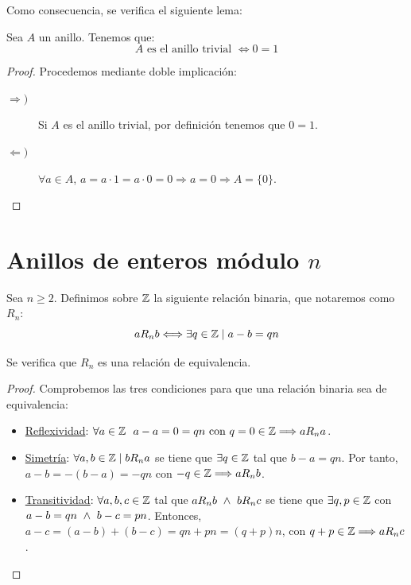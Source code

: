 Como consecuencia, se verifica el siguiente lema:
\begin{lema}
    Sea $A$ un anillo. Tenemos que:
    \begin{equation*}
        A \text{ es el anillo trivial } \Longleftrightarrow 0=1
    \end{equation*}
\end{lema}
\begin{proof}
    Procedemos mediante doble implicación:
    \begin{description}
        \item[$\Longrightarrow)$] Si $A$ es el anillo trivial, por definición tenemos que $0=1$.
        \item[$\Longleftarrow)$] $\forall a \in A$, $a = a\cdot 1 = a\cdot 0 = 0 \Longrightarrow a = 0 \Longrightarrow A = \{0\}$.
    \end{description}
\end{proof}

\section{Anillos de enteros módulo $n$}
\begin{definicion}
    Sea $n \geq 2$. Definimos sobre $\mathbb Z$ la siguiente relación binaria, que notaremos como $R_n$:
    \begin{equation*}
        aR_nb \Longleftrightarrow \exists q \in \mathbb Z \mid a-b = qn
    \end{equation*}
\end{definicion}

\begin{lema}
    Se verifica que $R_n$ es una relación de equivalencia.
\end{lema}
\begin{proof} Comprobemos las tres condiciones para que una relación binaria sea de equivalencia:
\begin{itemize}
    \item \underline{Reflexividad}: $\forall a \in \mathbb Z~~a-a = 0 = qn \mbox{ con } q = 0 \in \mathbb Z \Longrightarrow aR_na$.
    \item \underline{Simetría}: $\forall a,b \in \mathbb Z \mid bR_na$ se tiene que $\exists q \in \mathbb Z$ tal que $b-a = qn$. Por tanto, $a-b = -(b-a)=-qn$ con $-q \in \mathbb Z \Longrightarrow aR_nb$.
    \item \underline{Transitividad}: $\forall a,b,c \in \mathbb Z$ tal que $aR_nb \ \land \  bR_nc$ se tiene que $\exists q,p \in \mathbb Z $ con $ a-b = qn \ \land \  b-c = pn$. Entonces, $a-c = (a-b)+(b-c) = qn + pn = (q+p)n$, con $q+p\in \mathbb Z \Longrightarrow aR_nc$.
\end{itemize}
\end{proof}

